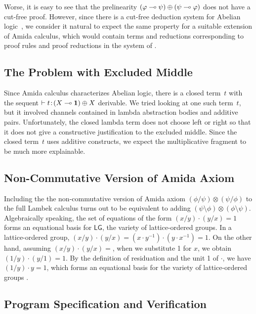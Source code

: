 Worse, it is easy to see that the prelinearity
$(\varphi\multimap\psi)\oplus(\psi\multimap\varphi)$ does not have a cut-free proof.
However,
since there is a cut-free deduction system for Abelian
logic~\citep{metcalfe2006},
we consider it natural to expect the same property for a suitable
extension of Amida calculus, which would contain terms and reductions
corresponding to proof rules and proof reductions in the system of \citet{metcalfe2006}.

\subsection{The Problem with Excluded Middle}
\label{computational-meaning}

Since Amida calculus characterizes Abelian logic,
there is a closed term~$t$ with the sequent $\vdash{t} \mathord{\colon\kern -2pt}{(X\multimap \mathbf{1})\oplus X}$
derivable.
We tried looking at one such term~$t$, but it involved channels
contained in lambda abstraction bodies and additive pairs.
Unfortunately, the closed lambda term does not choose left or right so
that it does not give a constructive justification to the excluded
middle.
Since the closed term~$t$ uses additive constructs, we expect the
multiplicative fragment to be much more explainable.

\subsection{Non-Commutative Version of Amida Axiom}

Including the
the non-commutative version of Amida axiom $(\phi/\psi)\otimes(\psi/\phi)$
to the full Lambek calculus turns out to be equivalent to
adding $(\psi\setminus\phi)\otimes(\phi\setminus\psi)$.
Algebraically speaking,
the set of equations of the form $(x/y)\cdot(y/x) = 1$ forms an
equational basis for $\mathsf{LG}$, the variety of lattice-ordered
groups.
In a lattice-ordered group,
$(x/y)\cdot (y/x) = (x \cdot y^{-1}) \cdot (y \cdot x^{-1}) = 1$.
On the other hand, assuming $(x/y)\cdot (y/x) = $, when we substitute 1
for $x$, we obtain $(1/y)\cdot (y/1) = 1$.
By the definition of residuation and the unit 1 of $\cdot$,
we have $(1/y)\cdot y = 1$, which forms an equational basis for the
variety of lattice-ordered groups \citep[Lemma~3.25]{residuated}.

\subsection{Program Specification and Verification}

